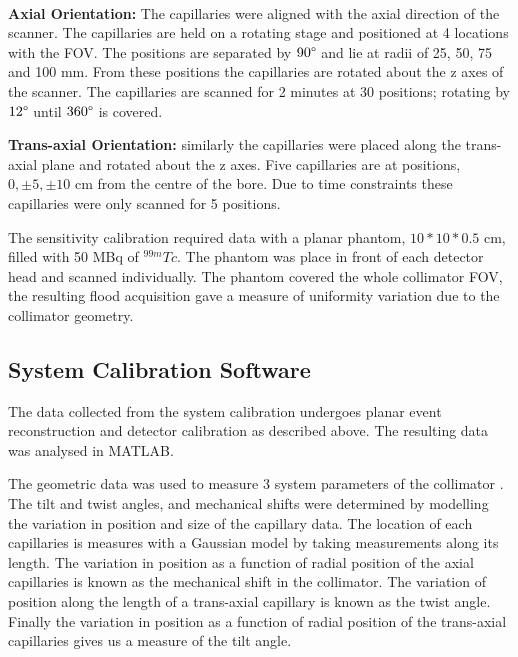 \paragraph{}

\textbf{Axial Orientation:} The capillaries were aligned with the axial direction of the scanner. The capillaries are held on a rotating stage and positioned at 4 locations with the \acrshort{FOV}. The positions are separated by $90\degree$ and lie at radii of 25, 50, 75 and 100 mm. From these positions the capillaries are rotated about the z axes of the scanner. The capillaries are scanned for 2 minutes at 30 positions; rotating by $12\degree$ until $360\degree$ is covered. 

\textbf{Trans-axial Orientation:} similarly the capillaries were placed along the trans-axial plane and rotated about the z axes. Five capillaries are at positions, $ 0, \pm 5, \pm 10 $ cm from the centre of the bore. Due to time constraints these capillaries were only scanned for 5 positions.

The sensitivity calibration required data with a planar phantom, $10 * 10 * 0.5$ cm, filled with 50 MBq of $^{99m}Tc$. The phantom was place in front of each detector head and scanned individually. The phantom covered the whole collimator \acrshort{FOV}, the resulting flood acquisition gave a measure of uniformity variation due to the collimator geometry. 

\subsection{System Calibration Software}
The data collected from the system calibration undergoes planar event reconstruction and detector calibration as described above. The resulting data was analysed in MATLAB.

The geometric data was used to measure 3 system parameters of the collimator \cite{TianyuMa2007DeterminationMicroPET}. The tilt and twist angles, and mechanical shifts were determined by modelling the variation in position and size of the capillary data. The location of each capillaries is measures with a Gaussian model by taking measurements along its length. The variation in position as a function of radial position of the axial capillaries is known as the mechanical shift in the collimator. The variation of position along the length of a trans-axial capillary is known as the twist angle. Finally the variation in position as a function of radial position of the trans-axial capillaries gives us a measure of the tilt angle. 

